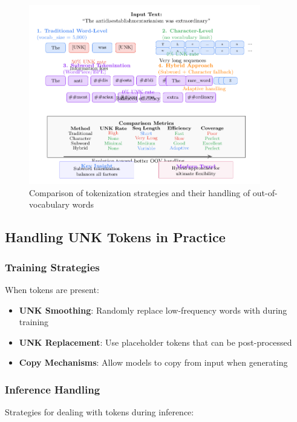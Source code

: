 \begin{figure}[h]
\centering
\includegraphics[width=0.9\textwidth]{part1/chapter02/fig_tokenization_comparison.pdf}
\caption{Comparison of tokenization strategies and their handling of out-of-vocabulary words}
\end{figure}

\subsection{Handling UNK Tokens in Practice}

\subsubsection{Training Strategies}
When \unk{} tokens are present:

\begin{itemize}
\item \textbf{UNK Smoothing}: Randomly replace low-frequency words with \unk{} during training
\item \textbf{UNK Replacement}: Use placeholder tokens that can be post-processed
\item \textbf{Copy Mechanisms}: Allow models to copy from input when generating \unk{}
\end{itemize}

\subsubsection{Inference Handling}
Strategies for dealing with \unk{} tokens during inference:

